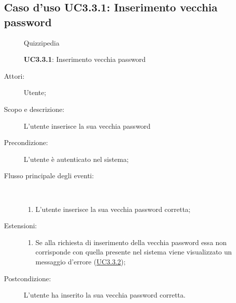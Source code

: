 \subsection{Caso d'uso UC3.3.1: Inserimento vecchia password}
	\begin{figure}[H]
		\centering
		\begin{resizedtikzpicture}{\textwidth}
		\begin{umlsystem}[x=0, fill=lightgray!20]{Quizzipedia}
		\end{umlsystem}
		\end{resizedtikzpicture}
		\caption{\textbf{UC3.3.1}: Inserimento vecchia password}
		\label{UC3.3.1}
	\end{figure}
\begin{description}
\item[Attori:] Utente;
\item[Scopo e descrizione:] L'utente inserisce la sua vecchia password
      \item[Precondizione:] L'utente è autenticato nel sistema;

        \item[Flusso principale degli eventi:] \ 
 \begin{enumerate}
          \item L'utente inserisce la sua vecchia password corretta;

      \end{enumerate}
    \item[Estensioni:]
      \begin{enumerate}
          \item Se alla richiesta di inserimento della vecchia password essa non corrisponde con quella presente nel sistema viene visualizzato un messaggio d'errore (\hyperlink{UC3.3.2}{UC3.3.2});

      \end{enumerate}
    \item[Postcondizione:] L'utente ha inserito la sua vecchia password corretta.
  \end{description}
\hypertarget{UC3.3.2}{}
